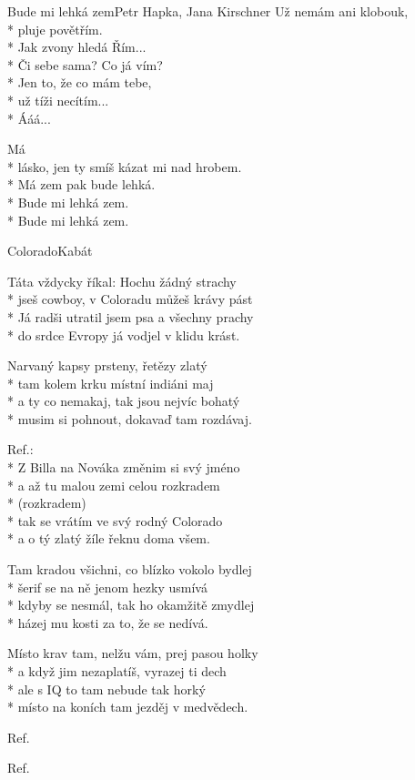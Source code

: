\documentclass[10.5pt]{book}
\newcommand\tab[1][1cm]{\hspace*{#1}}
\begin{document}
\begin{poem}{Bude mi lehká zem}{Petr Hapka, Jana Kirschner}
Už nemám ani klobouk,\\*
pluje povětřím.\\*
Jak zvony hledá Řím...\\*
Či sebe sama? Co já vím?\\*
Jen to, že co mám tebe,\\*
už tíži necítím...\\*
Ááá...

Má\\*
lásko, jen ty smíš kázat mi nad hrobem.\\*
Má zem pak bude lehká.\\*
Bude mi lehká zem.\\*
Bude mi lehká zem.

\end{poem}

\begin{poem}{Colorado}{Kabát}

\settowidth{\versewidth}{Já radši utratil jsem psa a všechny prachy}

Táta vždycky říkal: Hochu žádný strachy\\*
jseš cowboy, v Coloradu můžeš krávy pást\\*
Já radši utratil jsem psa a všechny prachy\\*
do srdce Evropy já vodjel v klidu krást.

Narvaný kapsy prsteny, řetězy zlatý\\*
tam kolem krku místní indiáni maj\\*
a ty co nemakaj, tak jsou nejvíc bohatý\\*
musim si pohnout, dokavaď tam rozdávaj.

Ref.:\\*
Z Billa na Nováka změnim si svý jméno\\*
a až tu malou zemi celou rozkradem\\*
\tab (rozkradem)\\*
tak se vrátím ve svý rodný Colorado\\*
a o tý zlatý žíle řeknu doma všem.

Tam kradou všichni, co blízko vokolo bydlej\\*
šerif se na ně jenom hezky usmívá\\*
kdyby se nesmál, tak ho okamžitě zmydlej\\*
házej mu kosti za to, že se nedívá.

Místo krav tam, nelžu vám, prej pasou holky\\*
a když jim nezaplatíš, vyrazej ti dech\\*
ale s IQ to tam nebude tak horký\\*
místo na koních tam jezděj v medvědech.

Ref.

Ref.

\end{poem}
\end{document}
